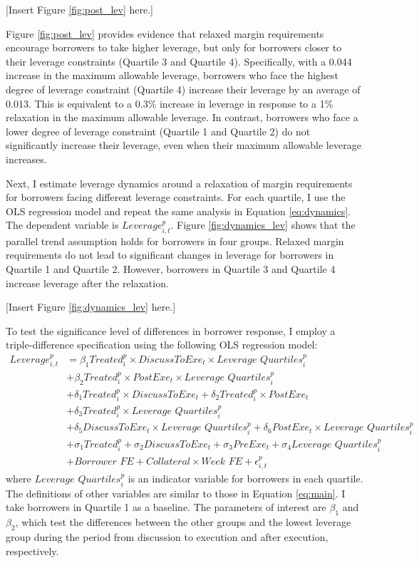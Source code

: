 \documentclass[12pt]{article}
\begin{document}
\centerline{[Insert Figure \ref{fig:post_lev} here.]}

Figure \ref{fig:post_lev} provides evidence that relaxed margin requirements encourage borrowers to take higher leverage, but only for borrowers closer to their leverage constraints (Quartile 3 and Quartile 4). Specifically, with a 0.044 increase in the maximum allowable leverage, borrowers who face the highest degree of leverage constraint (Quartile 4) increase their leverage by an average of 0.013. This is equivalent to a 0.3\% increase in leverage in response to a 1\% relaxation in the maximum allowable leverage. In contrast, borrowers who face a lower degree of leverage constraint (Quartile 1 and Quartile 2) do not significantly increase their leverage, even when their maximum allowable leverage increases.

Next, I estimate leverage dynamics around a relaxation of margin requirements for borrowers facing different leverage constraints. For each quartile, I use the OLS regression model and repeat the same analysis in Equation \ref{eq:dynamics}. The dependent variable is $Leverage_{i,t}^p$. Figure \ref{fig:dynamics_lev} shows that the parallel trend assumption holds for borrowers in four groups. Relaxed margin requirements do not lead to significant changes in leverage for borrowers in Quartile 1 and Quartile 2. However, borrowers in Quartile 3 and Quartile 4 increase leverage after the relaxation.


\centerline{[Insert Figure \ref{fig:dynamics_lev} here.]}

To test the significance level of differences in borrower response, I employ a triple-difference specification using the following OLS regression model:
\begin{align}
    \nonumber Leverage_{i,t}^{p} &= \beta_1Treated_{i}^p\times  DiscussToExe_t\times \textit{Leverage Quartiles}_{i}^p
    \\ \nonumber &+ \beta_2Treated^p_{i}\times PostExe_{t}\times\textit{Leverage Quartiles}_{i}^p \\
    \nonumber &+\delta_1Treated_{i}^p\times DiscussToExe_t + \delta_2Treated^p_{i}\times PostExe_{t} \\\nonumber &+\delta_3Treated_{i}^p\times \textit{Leverage Quartiles}_{i}^p  \\
        \nonumber &+\delta_5DiscussToExe_t\times \textit{Leverage Quartiles}_{i}^p+ \delta_6PostExe_{t}\times \textit{Leverage Quartiles}_{i}^p \\
        \nonumber &+ \sigma_1 Treated^p_{i} + \sigma_2 DiscussToExe_t+\sigma_3 PreExe_t+ \sigma_4\textit{Leverage Quartiles}_{i}^p\\
   &+\textit{Borrower FE} + \textit{Collateral}\times\textit{Week FE}+\epsilon_{i,t}^p\label{eq:triple_diff}
\end{align}
where $\textit{Leverage Quartiles}_{i}^p$ is an indicator variable for borrowers in each quartile. The definitions of other variables are similar to those in Equation \ref{eq:main}. I take borrowers in Quartile 1 as a baseline. The parameters of interest are $\beta_1$ and $\beta_2$, which test the differences between the other groups and the lowest leverage group during the period from discussion to execution and after execution, respectively.
\end{document}
